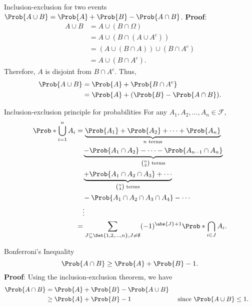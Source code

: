 \begin{Theorem}{Inclusion-exclusion for two events}{}
    $ \Prob{A\cup B}=\Prob{A}+\Prob{B}-\Prob{A\cap B} $.
    \tcblower{}
    \textbf{Proof}:
    \begin{align*}
        A\cup B
         & =A\cup (B\cap \Omega)              \\
         & =A\cup (B\cap (A\cup A^c))         \\
         & =(A\cup (B\cap A))\cup (B\cap A^c) \\
         & =A\cup (B\cap A^c).
    \end{align*}
    Therefore, $ A $ is disjoint from $ B\cap A^c $. Thus,
    \begin{align*}
        \Prob{A\cup B}
         & =\Prob{A}+\Prob{B\cap A^c}           \\
         & =\Prob{A}+(\Prob{B}-\Prob{A\cap B}).
    \end{align*}
\end{Theorem}
\begin{Theorem}{Inclusion-exclusion principle for probabilities}{}
    For any $ A_1,A_2,\ldots,A_n\in\mathcal{F} $,
    \begin{align*}
        \Prob*{\bigcup_{i=1}^n A_i}
         & =
        \underbrace{\Prob{A_1}+\Prob{A_2}+\cdots+\Prob{A_n}}_{n\text{ terms}}                              \\
         & \quad\underbrace{-\Prob{A_1\cap A_2}-\cdots-\Prob{A_{n-1}\cap A_n}}_{\binom{n}{2}\text{ terms}} \\
         & \quad\underbrace{+\Prob{A_1\cap A_2\cap A_3}+\cdots}_{\binom{n}{3}\text{ terms}}                \\
         & \quad - \Prob{A_1\cap A_2\cap A_3\cap A_4}-\cdots                                               \\
         & \quad\vdots                                                                                     \\
         & =\sum_{J\subseteq \Set{1,2,\ldots,n},J\ne \emptyset}(-1)^{\abs{J}+1}
        \Prob*{\bigcap_{i\in J}A_i}.
    \end{align*}
\end{Theorem}
\begin{Proposition}{Bonferroni's Inequality}{}
    \[ \Prob{A\cap B}\ge \Prob{A}+\Prob{B}-1. \]
    \tcblower{}
    \textbf{Proof}: Using the inclusion-exclusion theorem,
    we have
    \begin{align*}
        \Prob{A\cap B}
         & =\Prob{A}+\Prob{B}-\Prob{A\cup B}                                             \\
         & \ge \Prob{A}+\Prob{B}-1           &  & \text{ since $ \Prob{A\cup B}\le 1 $}.
    \end{align*}
\end{Proposition}
